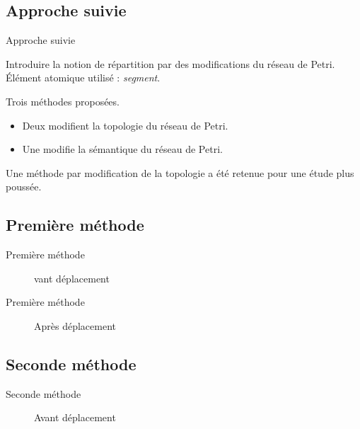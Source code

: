 \subsection{Approche suivie}
\begin{frame}{Approche suivie}
	\begin{itemize}
		\itemar Introduire la notion de répartition par des modifications du réseau de Petri.
		\itemar Élément atomique utilisé : \textit{segment}.
	\end{itemize}

	Trois méthodes proposées.
	\begin{itemize}
		\item Deux modifient la topologie du réseau de Petri.
		\item Une modifie la sémantique du réseau de Petri.
	\end{itemize}
	
	Une méthode par modification de la topologie a été retenue pour une étude plus poussée.
\end{frame}
\subsection{Première méthode}
\begin{frame}{Première méthode}
	\begin{figure}[h!]
		\centering
		
		\caption{vant déplacement}
		\label{fig:deplacementMethode1}
	\end{figure}
\end{frame}

\begin{frame}{Première méthode}
	\begin{figure}[h!]
		\centering
		
		\caption{Après déplacement}
		\label{fig:deplacementMethode1-2}
	\end{figure}
\end{frame}

\subsection{Seconde méthode}
\begin{frame}{Seconde méthode}
	\begin{figure}[h!]
		\centering
		
		\caption{Avant déplacement}
		\label{fig:deplacementMethode2}
	\end{figure}
\end{frame}

